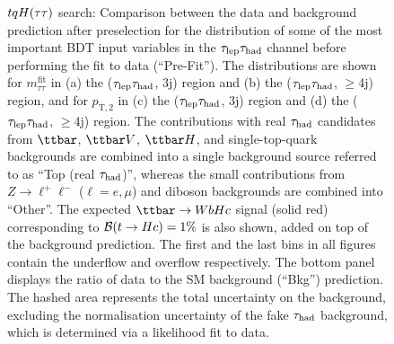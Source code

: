 \begin{figure}[t]
\begin{center}
\caption{$tqH(\tau\tau)$ search: Comparison between the data and background prediction after preselection for the distribution of some of the most
important BDT input variables in the $\tau_{\mathrm{lep}} \tau_{\mathrm{had}}$ channel before performing the fit to data (``Pre-Fit''). The distributions are shown for
$m_{\tau\tau}^{\text{fit}}$ in (a) the ($\tau_{\mathrm{lep}} \tau_{\mathrm{had}}$, 3j) region and (b) the ($\tau_{\mathrm{lep}} \tau_{\mathrm{had}}$, $\geq$4j) region, and for
$p_{\text{T},2}$ in (c) the ($\tau_{\mathrm{lep}} \tau_{\mathrm{had}}$, 3j)  region and (d) the ($\tau_{\mathrm{lep}} \tau_{\mathrm{had}}$, $\geq$4j) region.
The contributions with real $\tau_{\mathrm{had}}$ candidates from $\ttbar$,  $\ttbar V$, $\ttbar H$, and single-top-quark backgrounds are combined into
a single background source referred to as ``Top (real $\tau_{\mathrm{had}}$)'', whereas the small contributions from 
$Z\to \ell^+\ell^-$ ($\ell = e, \mu$) and diboson backgrounds are combined into ``Other''. 
The expected $\Hc$ signal (solid red) corresponding to $\mathcal{B}(t\to Hc)=1\%$ is also shown,
added on top of the background prediction.
The first and the last bins in all figures contain the underflow and overflow respectively.
The bottom panel displays the ratio of data to the SM background (``Bkg'') prediction.
The hashed area represents the total uncertainty on the background, excluding the normalisation uncertainty of the fake $\tau_{\mathrm{had}}$ background, 
which is determined via a likelihood fit to data.}
\label{fig:BDT_inputs_lephad}
\end{center}
\end{figure}

